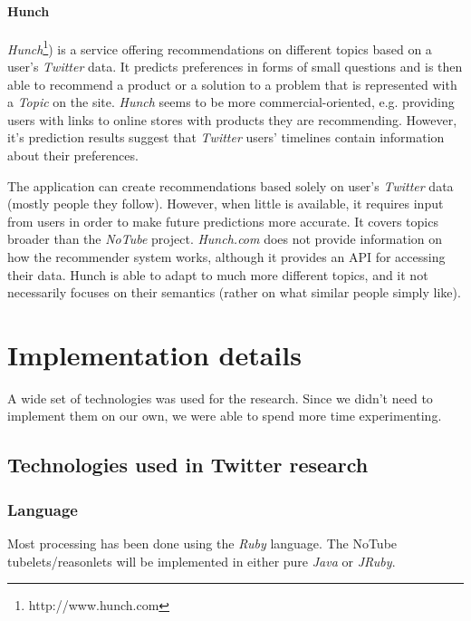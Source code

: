 \documentclass{article}
\begin{document}
\paragraph{Hunch}
\textit{Hunch}\footnote[2]{http://www.hunch.com}) is a service offering recommendations on different topics based on a user's \textit{Twitter} data. It predicts preferences in forms of small questions and is then able to recommend a product or a solution to a problem that is represented with a \textit{Topic} on the site. \textit{Hunch} seems to be more commercial-oriented, e.g. providing users with links to online stores with products they are recommending. However,
it's prediction results suggest that \textit{Twitter} users' timelines contain information about their preferences.

The application can create recommendations based solely on user's \textit{Twitter} data (mostly people they follow). However, when little is available, it requires input from users in order to make future predictions more accurate. It covers topics broader than the \textit{NoTube} project.
\textit{Hunch.com} does not provide information on how the recommender system works, although it provides an API for accessing their data.
Hunch is able to adapt to much more different topics, and it not necessarily focuses on their semantics (rather on what similar people simply like).















\section{Implementation details}

A wide set of technologies was used for the research. Since we didn't need to implement them on our own, we were able to spend more time experimenting.

\subsection{Technologies used in Twitter research}
\subsubsection{Language}
Most processing has been done using the \textit{Ruby} language. The NoTube tubelets/reasonlets will be implemented in either pure \textit{Java} or \textit{JRuby}.
\end{document}
